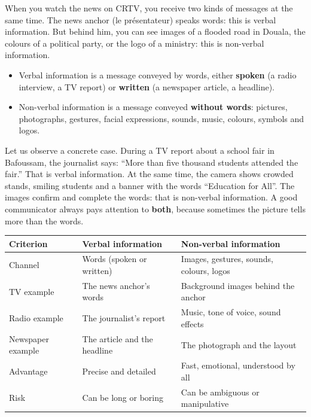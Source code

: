\documentclass[11pt]{article}
\newcommand{\cle}[1]{{\popxbold\color{popdark}#1}}
\begin{document}
When you watch the news on CRTV, you receive two kinds of messages at the same time. The \cle{news anchor} (le présentateur) speaks words: this is \cle{verbal information}. But behind him, you can see images of a flooded road in Douala, the colours of a political party, or the logo of a ministry: this is \cle{non-verbal information}.

\begin{definition}
\begin{itemize}
\item \cle{Verbal information} is a message conveyed by words, either \textbf{spoken} (a radio interview, a TV report) or \textbf{written} (a newspaper article, a headline).
\item \cle{Non-verbal information} is a message conveyed \textbf{without words}: pictures, photographs, gestures, facial expressions, sounds, music, colours, symbols and logos.
\end{itemize}
\end{definition}

Let us observe a concrete case. During a TV report about a school fair in Bafoussam, the journalist says: ``More than five thousand students attended the fair.'' That is verbal information. At the same time, the camera shows crowded stands, smiling students and a banner with the words ``Education for All''. The images confirm and complete the words: that is non-verbal information. A good communicator always pays attention to \textbf{both}, because sometimes the picture tells more than the words.

\begin{center}
\begin{tabularx}{\linewidth}{|l|X|X|}
\hline
\rowcolor{popblueL} \textbf{Criterion} & \textbf{Verbal information} & \textbf{Non-verbal information} \\
\hline
Channel & Words (spoken or written) & Images, gestures, sounds, colours, logos \\
\hline
TV example & The news anchor's words & Background images behind the anchor \\
\hline
Radio example & The journalist's report & Music, tone of voice, sound effects \\
\hline
Newspaper example & The article and the headline & The photograph and the layout \\
\hline
Advantage & Precise and detailed & Fast, emotional, understood by all \\
\hline
Risk & Can be long or boring & Can be ambiguous or manipulative \\
\hline
\end{tabularx}
\end{center}
\end{document}
